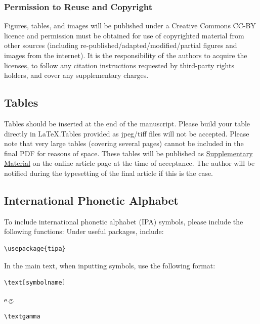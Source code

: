 \documentclass[utf8]{FrontiersinHarvard} %
\begin{document}
\subsubsection{Permission to Reuse and Copyright}
Figures, tables, and images will be published under a Creative Commons CC-BY licence and permission must be obtained for use of copyrighted material from other sources (including re-published/adapted/modified/partial figures and images from the internet). It is the responsibility of the authors to acquire the licenses, to follow any citation instructions requested by third-party rights holders, and cover any supplementary charges.

\subsection{Tables}
Tables should be inserted at the end of the manuscript. Please build your table directly in LaTeX.Tables provided as jpeg/tiff files will not be accepted. Please note that very large tables (covering several pages) cannot be included in the final PDF for reasons of space. These tables will be published as \href{http://home.frontiersin.org/about/author-guidelines#SupplementaryMaterial}{Supplementary Material} on the online article page at the time of acceptance. The author will be notified during the typesetting of the final article if this is the case.

\subsection{International Phonetic Alphabet}
To include international phonetic alphabet (IPA) symbols, please include the following functions:
Under useful packages, include:\begin{verbatim}\usepackage{tipa}\end{verbatim}
In the main text, when inputting symbols, use the following format:\begin{verbatim}\text[symbolname]\end{verbatim}e.g.\begin{verbatim}\textgamma\end{verbatim}
\end{document}
